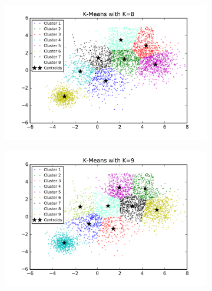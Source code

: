 \begin{description}
\begin{figure}[htb]
\begin{subfigure}[b]{0.475\textwidth}
        \end{subfigure}
        \hfill
        \begin{subfigure}[b]{0.475\textwidth}  
            \centering 
            \includegraphics[width=\textwidth]{./figures/bigClustering_kMeans_8.png}
        \end{subfigure}
        \begin{subfigure}[b]{0.475\textwidth}   
            \centering 
            \includegraphics[width=\textwidth]{./figures/bigClustering_kMeans_9.png}
        \end{subfigure}
        \hfill
        \begin{subfigure}[b]{0.475\textwidth}   
            \centering 

\end{subfigure}
\end{figure}
\end{description}
